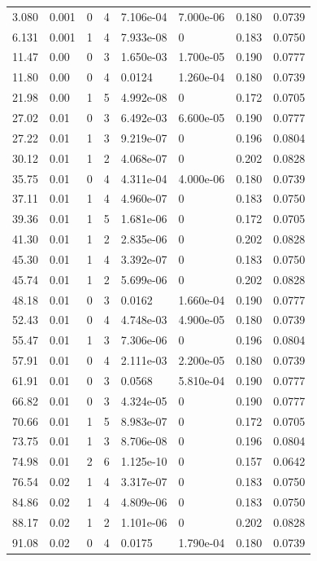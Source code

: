 \documentclass[preview]{standalone}
\begin{document}
{{\begin{tabular}{L{1.2cm}C{1.2cm} C{0.3cm}C{0.5cm} C{1.4cm}C{1.4cm} C{1.4cm}C{1.4cm}}
  3.080  &  0.001  & 0     &  4 &  7.106e-04  & 7.000e-06  & 0.180 &  0.0739   \\ 
  6.131  &  0.001  & 1     &  4 &  7.933e-08  & 0  & 0.183 &  0.0750   \\ 
  11.47  &  0.00  & 0     &  3 &  1.650e-03  & 1.700e-05  & 0.190 &  0.0777   \\ 
  11.80  &  0.00  & 0     &  4 &  0.0124  & 1.260e-04  & 0.180 &  0.0739   \\ 
  21.98  &  0.00  & 1     &  5 &  4.992e-08  & 0  & 0.172 &  0.0705   \\ 
  27.02  &  0.01  & 0     &  3 &  6.492e-03  & 6.600e-05  & 0.190 &  0.0777   \\ 
  27.22  &  0.01  & 1     &  3 &  9.219e-07  & 0  & 0.196 &  0.0804   \\ 
  30.12  &  0.01  & 1     &  2 &  4.068e-07  & 0  & 0.202 &  0.0828   \\ 
  35.75  &  0.01  & 0     &  4 &  4.311e-04  & 4.000e-06  & 0.180 &  0.0739   \\ 
  37.11  &  0.01  & 1     &  4 &  4.960e-07  & 0  & 0.183 &  0.0750   \\ 
  39.36  &  0.01  & 1     &  5 &  1.681e-06  & 0  & 0.172 &  0.0705   \\ 
  41.30  &  0.01  & 1     &  2 &  2.835e-06  & 0  & 0.202 &  0.0828   \\ 
  45.30  &  0.01  & 1     &  4 &  3.392e-07  & 0  & 0.183 &  0.0750   \\ 
  45.74  &  0.01  & 1     &  2 &  5.699e-06  & 0  & 0.202 &  0.0828   \\ 
  48.18  &  0.01  & 0     &  3 &  0.0162  & 1.660e-04  & 0.190 &  0.0777   \\ 
  52.43  &  0.01  & 0     &  4 &  4.748e-03  & 4.900e-05  & 0.180 &  0.0739   \\ 
  55.47  &  0.01  & 1     &  3 &  7.306e-06  & 0  & 0.196 &  0.0804   \\ 
  57.91  &  0.01  & 0     &  4 &  2.111e-03  & 2.200e-05  & 0.180 &  0.0739   \\ 
  61.91  &  0.01  & 0     &  3 &  0.0568  & 5.810e-04  & 0.190 &  0.0777   \\ 
  66.82  &  0.01  & 0     &  3 &  4.324e-05  & 0  & 0.190 &  0.0777   \\ 
  70.66  &  0.01  & 1     &  5 &  8.983e-07  & 0  & 0.172 &  0.0705   \\ 
  73.75  &  0.01  & 1     &  3 &  8.706e-08  & 0  & 0.196 &  0.0804   \\ 
  74.98  &  0.01  & 2     &  6 &  1.125e-10  & 0  & 0.157 &  0.0642   \\ 
  76.54  &  0.02  & 1     &  4 &  3.317e-07  & 0  & 0.183 &  0.0750   \\ 
  84.86  &  0.02  & 1     &  4 &  4.809e-06  & 0  & 0.183 &  0.0750   \\ 
  88.17  &  0.02  & 1     &  2 &  1.101e-06  & 0  & 0.202 &  0.0828   \\ 
  91.08  &  0.02  & 0     &  4 &  0.0175  & 1.790e-04  & 0.180 &  0.0739   \\ 
\hline 
\end{tabular} 

}}
\end{document}
